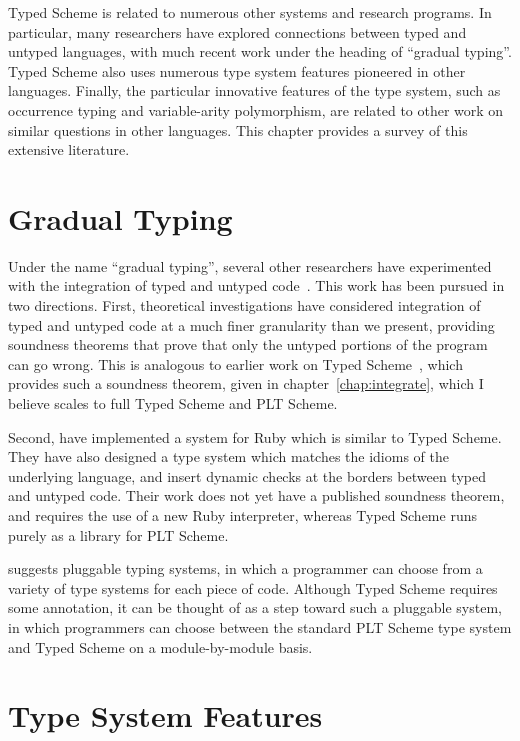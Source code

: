 \begin{schemeregion}
Typed Scheme is  related to numerous other systems and
research programs.  In particular, many researchers have explored
connections between typed and untyped languages, with much recent work
under the heading of ``gradual typing''.  Typed Scheme also uses
numerous type system features pioneered in other languages.  Finally,
the particular innovative features of the type system, such as
occurrence typing and variable-arity polymorphism, are related to
other work on similar questions in other languages.   This chapter
provides a survey of this extensive literature.  

\section{Gradual Typing}

Under the name ``gradual typing'', several other researchers have
experimented with the integration of typed and untyped
code~\cite{st:gradual06, Herman07, wadler-findler, 
  ii:gradual-featherweight, stop09}.
  This work
has been pursued in two directions.  First, theoretical investigations
have considered integration of typed and untyped code at a much finer
granularity than we present, providing soundness theorems that prove
that only the untyped portions of the program can go wrong.  This is
analogous to earlier work on Typed Scheme~\cite{thf:dls2006},
which provides such a soundness theorem, given in chapter~\ref{chap:integrate}, which I believe scales to
full Typed Scheme and PLT Scheme. 

Second, \citet{furr:ruby:sac, furr:ruby:stop} have implemented a
system for Ruby which is similar to Typed Scheme.  They have also
designed a type system which matches the idioms of the underlying
language, and insert dynamic checks at the borders between typed and
untyped code.  Their work does not yet have a published soundness
theorem, and requires the use of a new Ruby interpreter, whereas Typed
Scheme runs purely as a library for PLT Scheme.

\citet{bracha:pluggable} suggests pluggable typing systems, in which a
programmer can choose from a variety of type systems for each piece of
code.  Although Typed Scheme requires some annotation, it can be thought of
as a step toward such a pluggable system, in which programmers can choose
between the standard PLT Scheme type system and Typed Scheme on a
module-by-module basis.

\section{Type System Features}


\end{schemeregion}
